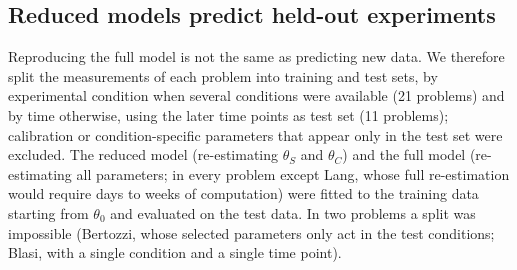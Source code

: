 \documentclass[pdflatex,sn-nature]{sn-jnl}
\theoremstyle{plain}
\begin{document}
\begin{table}[p]
\caption{\textbf{Per-problem results.} $p$, number of estimated parameters; $m$, number of measurements; $|\Theta_C|$, calibration parameters (always re-estimated); $|S|$, selected biological parameters; Stage, stage that produced the subset; $e_{\mathrm{rel}}$ and $e_{\mathrm{fit}}$, median relative error over 15 scenarios at $\pm$5\% without and with re-estimation (admissibility: $e_{\mathrm{fit}}\le 43.6\%$; italic, not admissible; $^{\ast}$, $e_{\mathrm{fit}}$ computed to first order because of simulation cost; $^{\dagger}$, not defined because the model has no solution on the measured horizon for 1\% parameter changes); Pattern, behaviour of the median $e_{\mathrm{fit}}$ for perturbation sizes from $\pm$1\% to $\pm$50\% (A, admissible at all sizes; B, admissible up to at least $\pm$20\% and not beyond; C, irregular; D, not admissible at $\pm$10\% or less; --, not applicable); Test $\chi^2/n$, mean squared noise-scaled residual on held-out experiments for the reduced and the full model, both re-estimated on the training experiments (values near 1 mean errors of the size of the measurement noise; --, not evaluable or not run).}
\label{tab:benchmark}
\centering
\scriptsize
\setlength{\tabcolsep}{4pt}

\end{table}

\subsection*{Reduced models predict held-out experiments}\label{sec:validation}

Reproducing the full model is not the same as predicting new data. We therefore split the measurements of each problem into training and test sets, by experimental condition when several conditions were available (21 problems) and by time otherwise, using the later time points as test set (11 problems); calibration or condition-specific parameters that appear only in the test set were excluded. The reduced model (re-estimating $\theta_S$ and $\theta_C$) and the full model (re-estimating all parameters; in every problem except Lang, whose full re-estimation would require days to weeks of computation) were fitted to the training data starting from $\theta_0$ and evaluated on the test data. In two problems a split was impossible (Bertozzi, whose selected parameters only act in the test conditions; Blasi, with a single condition and a single time point).
\end{document}
